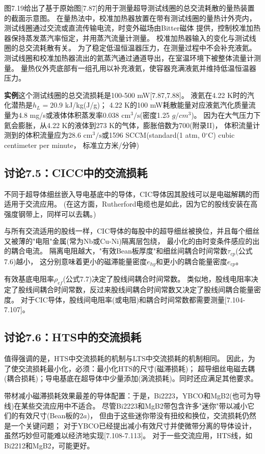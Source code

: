 图7.19给出了基于原始图[7.87]的用于测量超导测试线圈的总交流耗散的量热装置的截面示意图。
在量热法中，校准加热器放置在带有测试线圈的量热计外壳内，测试线圈通过交流或直流传输电流，时变外磁场由Bitter磁体
提供，控制校准加热器保持蒸发蒸汽率恒定，并用蒸汽流量计测量。
校准加热器输入的变化与测试线圈的总交流耗散有关。
为了稳定低温恒温器压力，在测量过程中不会补充液氦。
测试线圈和校准加热器流出的氦蒸汽通过通道导出，在室温环境下被整体流量计测量。
量热仪外壳底部有一组孔用以补充液氦，使容器充满液氦并维持低温恒温器压力。

\textbf{实例}\quad 这个测试线圈的总交流损耗是100-500 mW[7.87,7.88]。
液氦在4.22 K时的汽化潜热是$h_L=20.9$ kJ/kg(J/g)；
4.22 K的100 mW耗散能量对应液氦汽化质量流量为4.8 mg/s或液体体积蒸发率0.038 $\mathrm{cm^3/s}$(密度1.25 $g/cm^3$)。
因为在大气压力下氦会膨胀，从4.22 K的液体到273 K的气体，膨胀倍数为700(附录II)，
体积流量计测到的体积流量应为28.6 $\mathrm{cm^3/s}$或1596 SCCM(standard(1 atm, 0$^\circ$C) cubic centimeter per minute， 标准立方米/分钟)

\subsection{讨论7.5：CICC中的交流损耗}
不同于超导体细丝嵌入导电基底中的导体，CIC导体因其股线可以是电磁解耦的而适用于交流应用。
(在这方面，Rutherford电缆也是如此，因为它的股线安装在高强度钢带上，同样可以去耦。)

与所有交流适用的股线一样，CIC导体的每股中的超导细丝被换位，并且每个细丝又被薄的"电阻"金属(常为Nb或Cu-Ni)隔离层包绕，
最小化的由时变条件感应的出的耦合电流。
隔离电阻越大，"有效Bean板厚度"和细丝间耦合时间常数$\tau_{cp}$(公式7.6)越小，
这分别意味着更小的磁滞能量密度$e_{hy}$和更小的耦合能量密度$e_{cp}$。

有效基底电阻率$\rho_{ef}$(公式7.7)决定了股线间耦合时间常数。
类似地，股线电阻率决定了股线间耦合时间常数，反过来股线间耦合时间常数又决定了股线间耦合能量密度。
对于CIC导体，股线间电阻率(或电阻)和耦合时间常数都需要测量[7.104-7.107]。

\subsection{讨论7.6：HTS中的交流损耗}
值得强调的是，HTS中交流损耗的机制与LTS中交流损耗的机制相同。
因此，为了使交流损耗最小化，必须：最小化HTS的尺寸(磁滞损耗)；
超导细丝电磁去耦(耦合损耗)；导电基底在超导体中少量添加(涡流损耗)。同时还应满足其他要求。

带材减小磁滞损耗效果最差的导体配置：于是，Bi2223，YBCO和MgB2(也可为导线)在某些交流应用中不适合。
尽管Bi2223和MgB2带包含许多"迷你"带以减小它们的有效尺寸(Bean板的$2a$)，
但由于这些迷你带没有扭绞和换位，交流损耗仍然是一个关键问题；
对于YBCO已经提出减小有效尺寸并使微带分离的导体设计，虽然巧妙但可能难以经济地实现[7.108-7.113]。
对于一些交流应用，HTS线，如Bi2212和MgB2，可能更好。


